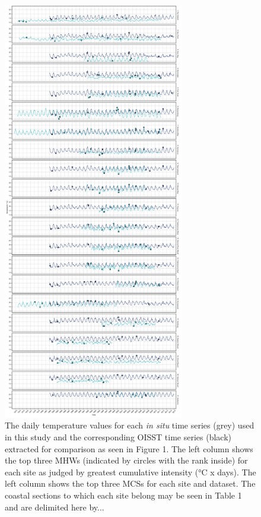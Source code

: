 \documentclass[a4paper,10pt,review]{elsarticle}
\begin{document}
\begin{figure}
\centering \includegraphics[width=0.70\textwidth]{figure2.pdf}
\caption{The daily temperature values for each \emph{in situ} time series (grey) used in this study and the corresponding OISST time series (black) extracted for comparison as seen in Figure 1. The left column shows the top three MHWs (indicated by circles with the rank inside) for each site as judged by greatest cumulative intensity (°C x days). The left column shows the top three MCSs for each site and dataset. The coastal sections to which each site belong may be seen in Table 1 and are delimited here by...} \label{fig:Figure2}
\end{figure}
\end{document}
